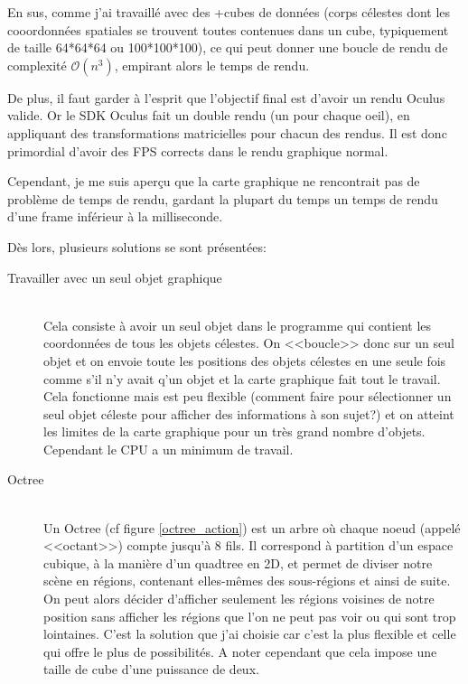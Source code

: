 \documentclass[a4paper,french,12pt]{article}
\begin{document}
		  En sus, comme j'ai travaillé avec des +cubes de données (corps célestes dont les cooordonnées spatiales se trouvent toutes
		  contenues dans un cube, typiquement de taille 64*64*64 ou 100*100*100), ce qui peut donner une boucle de rendu
		  de complexité $\mathcal{O}(n^3)$, empirant alors le temps de rendu.

		  De plus, il faut garder à l'esprit que l'objectif final est d'avoir un rendu Oculus valide. Or le
		  SDK Oculus fait un double rendu (un pour chaque oeil), en appliquant des transformations matricielles
		  pour chacun des rendus. Il est donc primordial d'avoir des FPS corrects dans le rendu graphique normal.

		  Cependant, je me suis aperçu que la carte graphique ne rencontrait pas de problème de temps de rendu,
		  gardant la plupart du temps un temps de rendu d'une frame inférieur à la milliseconde.

		  Dès lors, plusieurs solutions se sont présentées:

		  \begin{description}
		  \item [Travailler avec un seul objet graphique]~\\ Cela consiste à avoir un seul objet dans le programme qui
		  contient les coordonnées de tous les objets célestes. On <<boucle>> donc sur un seul objet et on envoie toute
		  les positions des objets célestes en une seule fois comme s'il n'y avait q'un objet et la carte
		  graphique fait tout le travail. Cela fonctionne mais est peu flexible (comment faire pour sélectionner
		  un seul objet céleste pour afficher des informations à son sujet?) et on atteint les limites de la
		  carte graphique pour un très grand nombre d'objets. Cependant le CPU a un minimum de travail.

		  \item [Octree]~\\ Un Octree (cf figure \ref{octree_action}) est un arbre où chaque noeud (appelé <<octant>>) compte jusqu'à 8 fils. Il correspond à partition
		  d'un espace cubique, à la manière d'un quadtree en 2D, et permet de diviser notre scène en régions,
		  contenant elles-mêmes des sous-régions et ainsi de suite. On peut alors décider d'afficher seulement les
		  régions voisines de notre position sans afficher les régions que l'on ne peut pas voir ou qui sont
		  trop lointaines. C'est la solution que j'ai choisie car c'est la plus flexible et celle qui offre le
		  plus de possibilités. A noter cependant que cela impose une taille de cube d'une puissance de deux.

		  \FloatBarrier
		\end{description}
\end{document}
